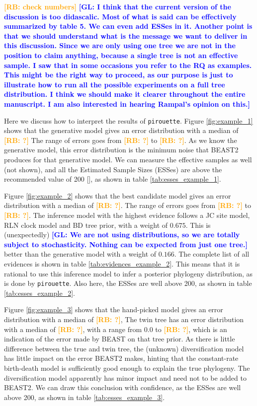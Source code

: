 \documentclass{article}
\newcommand{\giovanni}[1]{\textcolor{blue}{\textbf{[GL: #1]}}}
\newcommand{\richel}[1]{\textcolor{orange}{\textbf{[RB: #1]}}}
\begin{document}
\richel{check numbers}
\giovanni{I think that the current version of the discussion is too didascalic. Most of what is said can be effectively summarized by table 5. We can even add ESSes in it. Another point is that we should understand what is the message we want to deliver in this discussion. Since we are only using one tree we are not in the position to claim anything, because a single tree is not an effective sample. I saw that in some occasions you refer to the RQ as examples. This might be the right way to proceed, as our purpose is just to illustrate how to run all the possible experiments on a full tree distribution. I think we should make it clearer throughout the entire manuscript. I am also interested in hearing Rampal's opinion on this.}

Here we discuss how to interpret the results of \verb;pirouette;.
Figure \ref{fig:example_1} shows that the generative model 
gives an error distribution with a median of \richel{?}
The range of errors goes from \richel{?} to \richel{?}.
As we know the generative model, this error distribution is the minimum noise that BEAST2 produces for that generative model.
We can measure the effective samples as well (not shown), 
and all the Estimated Sample Sizes (ESSes) are above
the recommended value of 200 [\cite{drummond2015bayesian}], 
as shown in table \ref{tab:esses_example_1}.

Figure \ref{fig:example_2} shows that the best candidate model gives an error distribution with a median of \richel{?}. 
The range of errors goes from \richel{?} to \richel{?}. 
The inference model with the highest evidence follows a JC site model, RLN clock model and BD tree prior, with a weight of $0.675$. 
This is (unexpectedly) \giovanni{We are not using distributions, so we are totally subject to stochasticity. Nothing can be expected from just one tree.} better than the generative
model with a weight of $0.166$. 
The complete list of all evidences is shown in table \ref{tab:evidences_example_2}.
This means that it is rational to use this inference model to 
infer a posterior phylogeny distribution, as is done by \verb;pirouette;.
Also here, the ESSes are well above 200, 
as shown in table \ref{tab:esses_example_2}.

Figure \ref{fig:example_3} shows that the hand-picked model 
gives an error distribution with a median of \richel{?}, 
The twin tree has an error distribution with a median of \richel{?},
with a range from 0.0 to \richel{?}, which is an indication of the
error made by BEAST on that tree prior.
As there is little difference between the true and twin tree,
the (unknown) diversification model has little impact on the error
BEAST2 makes, hinting that the constant-rate birth-death model is
sufficiently good enough to explain the true phylogeny. 
The diversification model apparently has minor impact and need not to be
added to BEAST2.
We can draw this conclusion with confidence, as the ESSes are well above 200, 
as shown in table \ref{tab:esses_example_3}.
\end{document}
